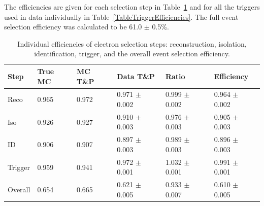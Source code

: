 
The efficiencies are given for each selection step in Table~\ref{TableEfficiencies} %
and for all the triggers used in data individually in Table~\ref{TableTriggerEfficiencies}.  
The full event selection efficiency was calculated to be 
61.0 $\pm$ 0.5\%.  

\begin{table}[htbp]
  \begin{center}
    \caption[\fixspacing Individual efficiencies of electron selection steps]
    {\fixspacing Individual efficiencies of electron selection steps: 
    reconstruction, isolation, identification, trigger, 
    and the overall event selection efficiency.}
    \label{TableEfficiencies}
    \begin{tabular}[]{ | l | l | l | l | l | l | }
      \hline
      Step & True MC & MC T\&P & Data T\&P & Ratio & Efficiency \\ \hline \hline
      Reco & 0.965 & 0.972 & 0.971 $\pm$ 0.002 & 0.999 $\pm$ 0.002 & 0.964 $\pm$ 0.002 \\ \hline
      Iso & 0.926 & 0.927 & 0.910 $\pm$ 0.003 & 0.976 $\pm$ 0.003 & 0.905 $\pm$ 0.003 \\ \hline
      ID & 0.906 & 0.907 & 0.897 $\pm$ 0.003 & 0.989 $\pm$ 0.003 & 0.896 $\pm$ 0.003 \\ \hline
      Trigger & 0.959 & 0.941 & 0.972 $\pm$ 0.001 & 1.032 $\pm$ 0.001 & 0.991 $\pm$ 0.001 \\ \hline \hline
      Overall & 0.654 & 0.665 & 0.621 $\pm$ 0.005 & 0.933 $\pm$ 0.007 & 0.610 $\pm$ 0.005 \\ \hline %
    \end{tabular}
  \end{center}
\end{table}


